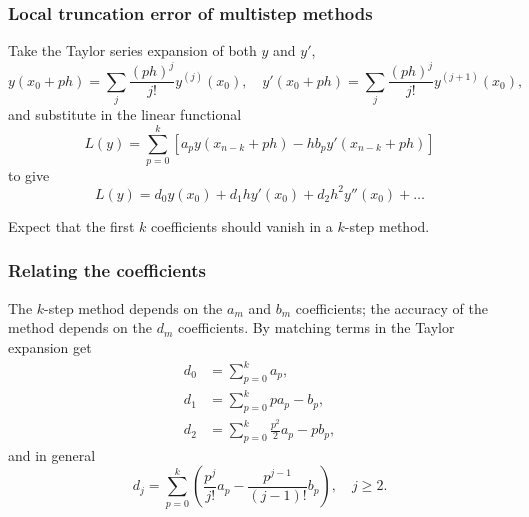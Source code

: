 \documentclass{beamer}
\begin{document}
\begin{frame}
  \frametitle{Local truncation error of multistep methods}

  Take the Taylor series expansion of both $y$ and $y'$,
  \begin{equation*}
    y(x_0 + p h)  = \sum_j \frac{(p h)^j}{j!} y^{(j)}(x_0), \quad
    y'(x_0 + p h) = \sum_j \frac{(p h)^j}{j!} y^{(j+1)}(x_0),
  \end{equation*}
  and substitute in the linear functional
  \begin{equation*}
    L(y) = \sum_{p=0}^k \left[ a_p y(x_{n-k} + p h) - h b_p y'(x_{n-k}
      + ph) \right]
  \end{equation*}
  to give
  \begin{equation*}
    L(y) = d_0 y(x_0) + d_1 h y'(x_0) + d_2 h^2 y''(x_0) + \dots
  \end{equation*} \pause

  \vspace{1ex}

  Expect that the first $k$ coefficients should vanish in a
  $k$-step method.

\end{frame}

\begin{frame}
  \frametitle{Relating the coefficients}

  The $k$-step method depends on the $a_m$ and $b_m$ coefficients; the
  accuracy of the method depends on the $d_m$ coefficients. By
  matching terms in the Taylor expansion get
  \begin{align*}
    d_0 & = \sum_{p=0}^k a_p, \\
    d_1 & = \sum_{p=0}^k p a_p - b_p, \\
    d_2 & = \sum_{p=0}^k \frac{p^2}{2} a_p - p b_p,
  \end{align*} \pause
  and in general
  \begin{equation*}
    d_j = \sum_{p=0}^k \left( \frac{p^j}{j!} a_p -
      \frac{p^{j-1}}{(j-1)!} b_p \right), \quad j \geq 2.
  \end{equation*}

\end{frame}
\end{document}
